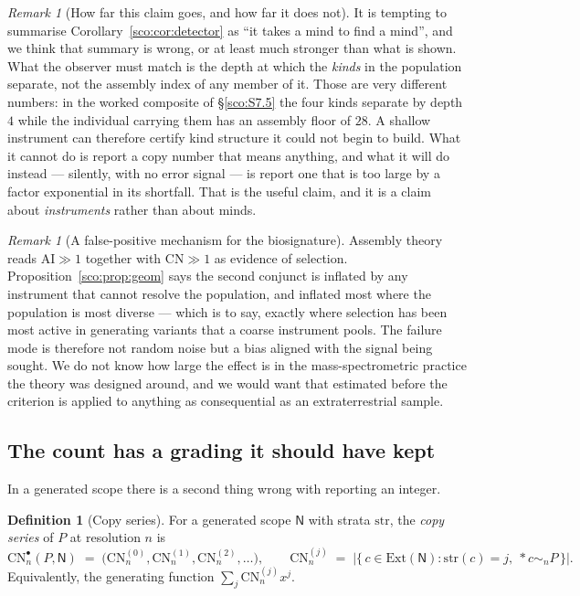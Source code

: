 \documentclass[11pt]{article}
\theoremstyle{plain}
\theoremstyle{definition}
\newtheorem{definition}[theorem]{Definition}
\theoremstyle{remark}
\newtheorem{remark}[theorem]{Remark}
\newcommand{\Nsp}{\mathsf{N}}
\newcommand{\drop}[1]{*#1}
\newcommand{\AI}{\mathrm{AI}}
\newcommand{\CN}{\mathrm{CN}}
\newcommand{\bisimn}[1]{\sim_{#1}}
\newcommand{\Ext}{\mathrm{Ext}}
\newcommand{\str}{\mathrm{str}}
\begin{document}
\begin{remark}[How far this claim goes, and how far it does not]
\label{sco:rem:notthatfar}
It is tempting to summarise Corollary~\ref{sco:cor:detector} as ``it takes
a mind to find a mind'', and we think that summary is wrong, or at least
much stronger than what is shown. What the observer must match is the
depth at which the \emph{kinds} in the population separate, not the
assembly index of any member of it. Those are very different numbers: in
the worked composite of \S\ref{sco:S7.5} the four kinds separate by depth
$4$ while the individual carrying them has an assembly floor of $28$. A
shallow instrument can therefore certify kind structure it could not
begin to build. What it cannot do is report a copy number that means
anything, and what it will do instead --- silently, with no error signal
--- is report one that is too large by a factor exponential in its
shortfall. That is the useful claim, and it is a claim about
\emph{instruments} rather than about minds.
\end{remark}

\begin{remark}[A false-positive mechanism for the biosignature]
\label{sco:rem:falsepos}
Assembly theory reads $\AI \gg 1$ together with $\CN \gg 1$ as evidence of
selection. Proposition~\ref{sco:prop:geom} says the second conjunct is
inflated by any instrument that cannot resolve the population, and inflated
most where the population is most diverse --- which is to say, exactly
where selection has been most active in generating variants that a coarse
instrument pools. The failure mode is therefore not random noise but a
bias aligned with the signal being sought. We do not know how large the
effect is in the mass-spectrometric practice the theory was designed
around, and we would want that estimated before the criterion is applied
to anything as consequential as an extraterrestrial sample.
\end{remark}

\subsection{The count has a grading it should have kept}\label{sco:S4.3}

In a generated scope there is a second thing wrong with reporting an
integer.

\begin{definition}[Copy series]\label{sco:def:series}
For a generated scope $\Nsp$ with strata $\str$, the \emph{copy series} of
$P$ at resolution $n$ is
\[
  \CN_n^{\bullet}(P,\Nsp) \;=\; \bigl( \CN_n^{(0)}, \CN_n^{(1)},
  \CN_n^{(2)}, \dots \bigr), \qquad
  \CN_n^{(j)} \;=\; \bigl|\{\, c \in \Ext(\Nsp) : \str(c) = j,\
  \drop{c} \bisimn{n} P \,\}\bigr| .
\]
Equivalently, the generating function $\sum_j \CN_n^{(j)} x^j$.
\end{definition}
\end{document}
